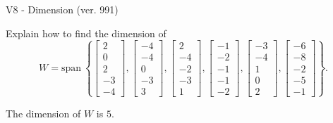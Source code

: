 \begin{exercise}
  \begin{exerciseTitle}V8 - Dimension (ver. 991)\end{exerciseTitle}
  \begin{exerciseStatement}
    Explain how to find the dimension of 
\[W=\mathrm{span}\ \left\{\left[\begin{array}{r}
2 \\
0 \\
2 \\
-3 \\
-4
\end{array}\right] , \left[\begin{array}{r}
-4 \\
-4 \\
0 \\
-3 \\
3
\end{array}\right] , \left[\begin{array}{r}
2 \\
-4 \\
-2 \\
-3 \\
1
\end{array}\right] , \left[\begin{array}{r}
-1 \\
-2 \\
-1 \\
-1 \\
-2
\end{array}\right] , \left[\begin{array}{r}
-3 \\
-4 \\
1 \\
0 \\
2
\end{array}\right] , \left[\begin{array}{r}
-6 \\
-8 \\
-2 \\
-5 \\
-1
\end{array}\right]\right\}.\]



  \end{exerciseStatement}
  \begin{exerciseAnswer}
   The dimension of \(W\) is  \(5\).
  


  \end{exerciseAnswer}
\end{exercise}